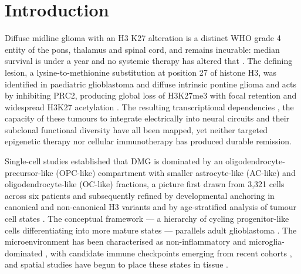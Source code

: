 \documentclass[12pt,a4paper]{article}
\begin{document}
\section{Introduction}

Diffuse midline glioma with an H3 K27 alteration is a distinct WHO grade 4 entity of the pons, thalamus and spinal
cord, and remains incurable: median survival is under a year and no systemic therapy has altered that
\citep{louis2021who,mackay2017integrated,hoffman2018clinical}. The defining lesion, a lysine-to-methionine
substitution at position 27 of histone H3, was identified in paediatric glioblastoma and diffuse intrinsic pontine
glioma \citep{schwartzentruber2012driver,wu2012somatic} and acts by inhibiting PRC2, producing global loss of
H3K27me3 with focal retention and widespread H3K27 acetylation
\citep{lewis2013inhibition,bender2013reduced,harutyunyan2019hkm,krug2019pervasive}. The resulting transcriptional
dependencies \citep{nagaraja2017transcriptional}, the capacity of these tumours to integrate electrically into neural
circuits \citep{venkatesh2019electrical} and their subclonal functional diversity \citep{vinci2018functional} have all
been mapped, yet neither targeted epigenetic therapy \citep{arrillagaromany2024onc} nor cellular immunotherapy
\citep{majzner2022gdcar} has produced durable remission.

Single-cell studies established that DMG is dominated by an oligodendrocyte-precursor-like (OPC-like) compartment with
smaller astrocyte-like (AC-like) and oligodendrocyte-like (OC-like) fractions, a picture first drawn from 3,321 cells
across six patients \citep{filbin2018developmental} and subsequently refined by developmental anchoring in canonical
and non-canonical H3 variants \citep{jessa2022km,jessa2019stalled} and by age-stratified analysis of tumour cell states
\citep{liu2022landscape}. The conceptual framework --- a hierarchy of cycling progenitor-like cells differentiating
into more mature states --- parallels adult glioblastoma \citep{patel2014singlecell,neftel2019integrative}. The
microenvironment has been characterised as non-inflammatory and microglia-dominated
\citep{lin2018noninflammatory,ross2024microglia}, with candidate immune checkpoints emerging from recent cohorts
\citep{collot2026igsfvista}, and spatial studies have begun to place these states in tissue
\citep{ren2023spatial,huchede2024bmp}.
\end{document}
